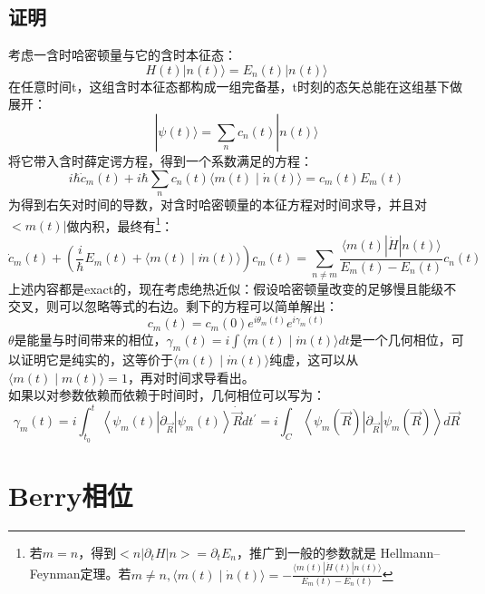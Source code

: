 \documentclass[10pt,openany]{book}
\theoremstyle{thmstyle} %
\theoremstyle{defstyle} %
\theoremstyle{prostyle} %
\begin{document}
\subsection*{证明}
考虑一含时哈密顿量与它的含时本征态：
\begin{equation}
	H(t)|n(t)\rangle=E_n(t)|n(t)\rangle
\end{equation}
在任意时间t，这组含时本征态都构成一组完备基，t时刻的态矢总能在这组基下做展开：
\begin{equation}
	|\psi(t)\rangle=\sum_n c_n(t)|n(t)\rangle
\end{equation}
将它带入含时薛定谔方程，得到一个系数满足的方程：
\begin{equation}
	i \hbar \dot{c}_m(t)+i \hbar \sum_n c_n(t)\langle m(t) \mid \dot{n}(t)\rangle=c_m(t) E_m(t)
\end{equation}
为得到右矢对时间的导数，对含时哈密顿量的本征方程对时间求导，并且对$ <m(t)| $做内积，最终有\footnote{若$m=n$，得到$<n|\partial_t H|n> = \partial_t E_n$，推广到一般的参数就是
Hellmann–Feynman定理。若$m\neq n,\langle m(t) \mid \dot{n}(t)\rangle=-\frac{\langle m(t)|\dot{H}(t)| n(t)\rangle}{E_m(t)-E_n(t)}$}：
\begin{equation}
	\dot{c}_m(t)+\left(\frac{i}{\hbar} E_m(t)+\langle m(t) \mid \dot{m}(t)\rangle\right) c_m(t)=\sum_{n \neq m} \frac{\langle m(t)|\dot{H}| n(t)\rangle}{E_m(t)-E_n(t)} c_n(t)
\end{equation} 
上述内容都是exact的，现在考虑绝热近似：假设哈密顿量改变的足够慢且能级不交叉，则可以忽略等式的右边。剩下的方程可以简单解出：
\begin{equation}
	c_m(t)=c_m(0) e^{i \theta_m(t)} e^{i \gamma_m(t)}
\end{equation}
$ \theta $是能量与时间带来的相位，$ \gamma_m(t)=i\int\langle m(t) \mid \dot{m}(t)\rangle dt $是一个几何相位，可以证明它是纯实的，这等价于$ \langle m(t) \mid \dot{m}(t)\rangle $纯虚，这可以从$ \langle m(t) \mid m(t)\rangle =1$，再对时间求导看出。\\

如果以对参数依赖而依赖于时间时，几何相位可以写为：
\begin{equation}
	\gamma_m(t)=i \int_{t_0}^t\left\langle\psi_m(t)\left|\partial_{\vec{R}}\right| \psi_m(t)\right\rangle \dot{\vec{R}} d t^{\prime}=i \int_C\left\langle\psi_m(\vec{R})\left|\partial_{\vec{R}}\right| \psi_m(\vec{R})\right\rangle d \vec{R}
\end{equation}
\section{Berry相位}
\end{document}
